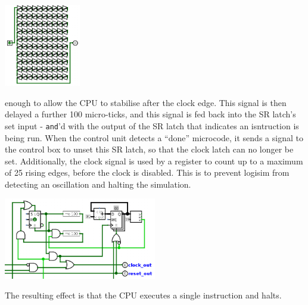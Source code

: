 \documentclass{article}
\def\gate#1{\uppercase{\Verb|#1|}}
\begin{document}
	\begin{center}\includegraphics[width=0.25\textwidth]{images/md_100.png}\end{center}

enough to allow the CPU to stabilise after the clock edge. This signal is then delayed a further 100 micro-ticks, and this signal is fed back into the SR latch's set input - \gate{and}'d with the output of the SR latch that indicates an isntruction is being run. When the control unit detects a ``done'' microcode, it sends a signal to the control box to unset this SR latch, so that the clock latch can no longer be set. Additionally, the clock signal is used by a register to count up to a maximum of 25 rising edges, before the clock is disabled. This is to prevent logisim from detecting an oscillation and halting the simulation.

	\begin{center}\includegraphics[width=0.5\textwidth]{images/SI_mode.png}\end{center}

The resulting effect is that the CPU executes a single instruction and halts.
\end{document}
